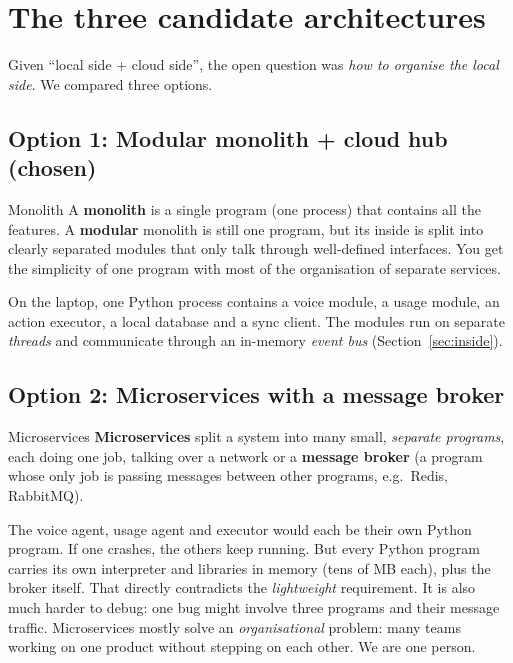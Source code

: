 \documentclass[11pt,a4paper]{article}
\begin{document}
\section{The three candidate architectures}

Given ``local side + cloud side'', the open question was \emph{how to organise the local
side}. We compared three options.

\subsection{Option 1: Modular monolith + cloud hub \quad(\textcolor{local}{chosen})}

\begin{concept}{Monolith}
A \textbf{monolith} is a single program (one process) that contains all the features.
A \textbf{modular} monolith is still one program, but its inside is split into clearly
separated modules that only talk through well-defined interfaces. You get the simplicity of
one program with most of the organisation of separate services.
\end{concept}

On the laptop, one Python process contains a voice module, a usage module, an action
executor, a local database and a sync client. The modules run on separate \emph{threads} and
communicate through an in-memory \emph{event bus} (Section~\ref{sec:inside}).

\subsection{Option 2: Microservices with a message broker}

\begin{concept}{Microservices}
\textbf{Microservices} split a system into many small, \emph{separate programs}, each doing
one job, talking over a network or a \textbf{message broker} (a program whose only job is
passing messages between other programs, e.g.\ Redis, RabbitMQ).
\end{concept}

The voice agent, usage agent and executor would each be their own Python program. If one
crashes, the others keep running. But every Python program carries its own interpreter and
libraries in memory (tens of MB each), plus the broker itself. That directly contradicts
the \emph{lightweight} requirement. It is also much harder to debug: one bug might involve
three programs and their message traffic. Microservices mostly solve an \emph{organisational}
problem: many teams working on one product without stepping on each other. We are one
person.
\end{document}
